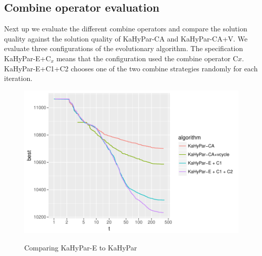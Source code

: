 \documentclass[a4paper,12pt,titlepage, BCOR7mm,headsepline]{scrbook}
\numberwithin{equation}{section}
\begin{document}
\subsection{Combine operator evaluation}
Next up we evaluate the different combine operators and compare the solution quality against the solution quality of KaHyPar-CA and KaHyPar-CA+V. We evaluate three configurations of the evolutionary algorithm. The specification KaHyPar-E+C$_x$ means that the configuration used the combine operator C$x$. KaHyPar-E+C1+C2 chooses one of the two combine strategies randomly for each iteration.
\begin{figure}[H]
\caption{Comparing KaHyPar-E to KaHyPar}
\begin{center}
\includegraphics{bachelorarbeit-basiccomparation}\label{fig:combineop}
\end{center} 

\end{figure}
\end{document}
